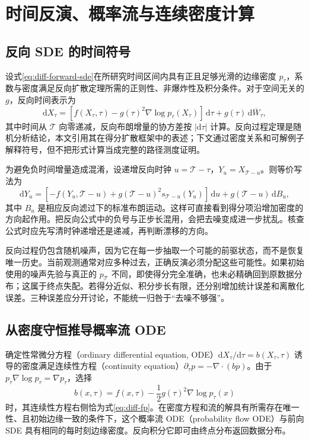 \documentclass[UTF8,12pt,a4paper,fontset=fandol]{ctexart}
\begin{document}
\section{时间反演、概率流与连续密度计算}
\label{sec:diff-reversal}
\subsection{反向 SDE 的时间符号}
设式\eqref{eq:diff-forward-sde}在所研究时间区间内具有正且足够光滑的边缘密度 $p_\tau$，系数与密度满足反向扩散定理所需的正则性、非爆炸性及积分条件。对于空间无关的 $g$，反向时间表示为
\begin{equation}
 \mathrm dX_\tau=[f(X_\tau,\tau)-g(\tau)^2\nabla\log p_\tau(X_\tau)]\,\mathrm d\tau
 +g(\tau)\,\mathrm d\overline W_\tau,
 \label{eq:diff-reverse-sde}
\end{equation}
其中时间从 $\mathcal T$ 向零递减，反向布朗增量的协方差按 $|\mathrm d\tau|$ 计算。反向过程定理是随机分析结论，本文引用其在得分扩散框架中的表述\cite{song2021sde}；下文通过密度关系和可解例子解释符号，但不把形式计算当成完整的路径测度证明。

为避免负时间增量造成混淆，设递增反向时钟 $u=\mathcal T-\tau$，$Y_u=X_{\mathcal T-u}$。则等价写法为
\[
 \mathrm dY_u=[-f(Y_u,\mathcal T-u)+g(\mathcal T-u)^2s_{\mathcal T-u}(Y_u)]\,\mathrm du
 +g(\mathcal T-u)\,\mathrm dB_u,
\]
其中 $B_u$ 是相应反向滤过下的标准布朗运动。这样可直接看到得分项沿增加密度的方向起作用。把反向公式中的负号与正步长混用，会把去噪变成进一步扰乱。核查公式时应先写清时钟递增还是递减，再判断漂移的方向。

反向过程仍包含随机噪声，因为它在每一步抽取一个可能的前驱状态，而不是恢复唯一历史。当前观测通常对应多种过去，正确反演必须分配这些可能性。如果初始使用的噪声先验与真正的 $p_{\mathcal T}$ 不同，即使得分完全准确，也未必精确回到原数据分布；这属于终点失配。若得分近似、积分步长有限，还分别增加统计误差和离散化误差。三种误差应分开讨论，不能统一归咎于“去噪不够强”。

\subsection{从密度守恒推导概率流 ODE}
确定性常微分方程（ordinary differential equation, ODE）$\mathrm dX_\tau/\mathrm d\tau=b(X_\tau,\tau)$ 诱导的密度满足连续性方程（continuity equation）$\partial_\tau p=-\nabla\cdot(bp)$。由于 $p_\tau\nabla\log p_\tau=\nabla p_\tau$，选择
\begin{equation}
 b(x,\tau)=f(x,\tau)-\frac12g(\tau)^2\nabla\log p_\tau(x)
 \label{eq:diff-pf-field}
\end{equation}
时，其连续性方程右侧恰为式\eqref{eq:diff-fp}。在密度方程和流的解具有所需存在唯一性、且初始边缘一致的条件下，这个概率流 ODE（probability flow ODE）与前向 SDE 具有相同的每时刻边缘密度。反向积分它即可由终点分布返回数据分布。
\end{document}
